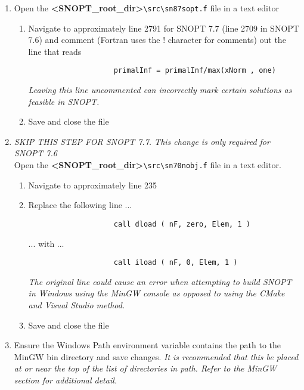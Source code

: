 \begin{enumerate}
	\item Open the \textbf{\textless SNOPT\_root\_dir\textgreater}\verb|\src\sn87sopt.f| file in a text editor
		\begin{enumerate}
			\item Navigate to approximately line 2791 for SNOPT 7.7 (line 2709 in SNOPT 7.6) and comment (Fortran uses the ! character for comments) out the line that reads 
				\begin{verbatim}
					primalInf = primalInf/max(xNorm , one)
				\end{verbatim}
			\emph{Leaving this line uncommented can incorrectly mark certain solutions as feasible in \ac{SNOPT}.}
			\item Save and close the file
		\end{enumerate}
	\item \emph{SKIP THIS STEP FOR SNOPT 7.7. This change is only required for SNOPT 7.6}\\ Open the \textbf{\textless SNOPT\_root\_dir\textgreater}\verb|\src\sn70nobj.f| file in a text editor.
		\begin{enumerate}
			\item Navigate to approximately line 235
			\item Replace the following line ...
				\begin{verbatim}
					call dload ( nF, zero, Elem, 1 )
				\end{verbatim}
				... with ...
				\begin{verbatim}
					call iload ( nF, 0, Elem, 1 )
				\end{verbatim}
				\emph{The original line could cause an error when attempting to build \ac{SNOPT} in Windows using the MinGW console as opposed to using the CMake and Visual Studio method.} 
			\item Save and close the file
		\end{enumerate}

    \item Ensure the Windows Path environment variable contains the path to the MinGW bin directory and save changes. 
	\emph{It is recommended that this be placed at or near the top of the list of directories in path. Refer to the MinGW section for additional detail.}


\end{enumerate}

